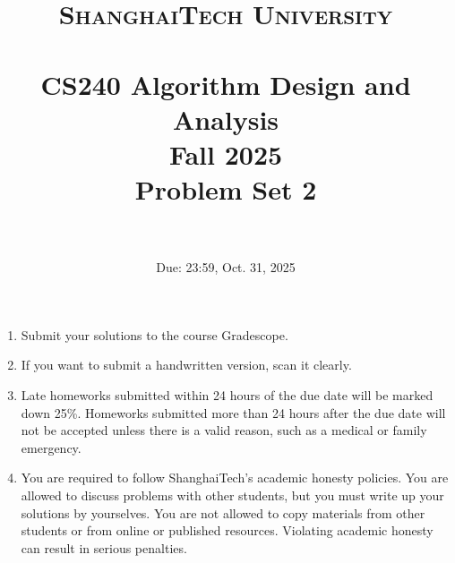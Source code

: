 \documentclass{article}
\title{
    \normalfont \normalsize
    \textsc{ShanghaiTech University} \\ [25pt]
    \horrule{0.5pt} \\[0.4cm] %
    \huge CS240 Algorithm Design and Analysis \\ %
    \LARGE Fall 2025\\
    \LARGE Problem Set 2\\
    \horrule{2pt} \\[0.5cm] %
}
\author{}
\date{Due: 23:59, Oct. 31, 2025}
\begin{document}
\maketitle
\vspace{3ex}

\begin{enumerate}
\item Submit your solutions to the course Gradescope.
\item If you want to submit a handwritten version, scan it clearly.
\item Late homeworks submitted within 24 hours of the due date will be marked down 25\%. Homeworks submitted more than 24 hours after the due date will not be accepted unless there is a valid reason, such as a medical or family emergency.  
\item You are required to follow ShanghaiTech's academic honesty policies. You are allowed to discuss problems with other students, but you must write up your solutions by yourselves. You are not allowed to copy materials from other students or from online or published resources. Violating academic honesty can result in serious penalties.  
\end{enumerate}

\newpage








% 
% 
% 
% 
\end{document}
